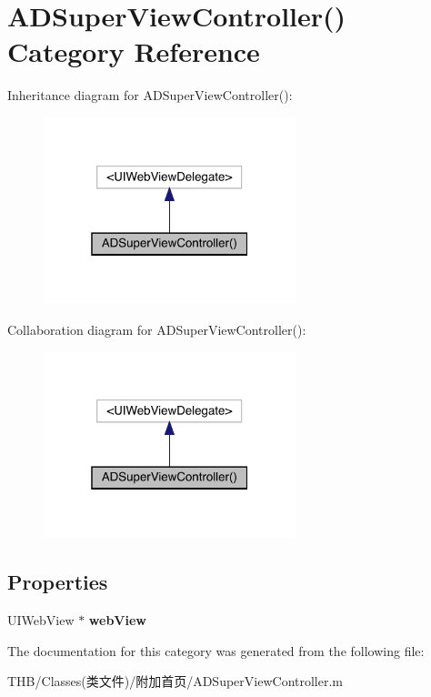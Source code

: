 \hypertarget{category_a_d_super_view_controller_07_08}{}\section{A\+D\+Super\+View\+Controller() Category Reference}
\label{category_a_d_super_view_controller_07_08}


Inheritance diagram for A\+D\+Super\+View\+Controller()\+:\nopagebreak
\begin{figure}[H]
\begin{center}
\leavevmode
\includegraphics[width=208pt]{category_a_d_super_view_controller_07_08__inherit__graph}
\end{center}
\end{figure}


Collaboration diagram for A\+D\+Super\+View\+Controller()\+:\nopagebreak
\begin{figure}[H]
\begin{center}
\leavevmode
\includegraphics[width=208pt]{category_a_d_super_view_controller_07_08__coll__graph}
\end{center}
\end{figure}
\subsection*{Properties}
\begin{DoxyCompactItemize}
\item 
\mbox{\label{category_a_d_super_view_controller_07_08_a16e7f91a65c90fcbb7aebcf555925831}} 
U\+I\+Web\+View $\ast$ {\bfseries web\+View}
\end{DoxyCompactItemize}


The documentation for this category was generated from the following file\+:\begin{DoxyCompactItemize}
\item 
T\+H\+B/\+Classes(类文件)/附加首页/A\+D\+Super\+View\+Controller.\+m\end{DoxyCompactItemize}
